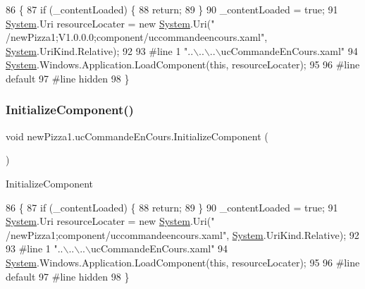 \begin{DoxyCode}
86                                           \{
87             \textcolor{keywordflow}{if} (\_contentLoaded) \{
88                 \textcolor{keywordflow}{return};
89             \}
90             \_contentLoaded = \textcolor{keyword}{true};
91             \hyperlink{namespaceSystem}{System}.Uri resourceLocater = \textcolor{keyword}{new} \hyperlink{namespaceSystem}{System}.Uri(\textcolor{stringliteral}{"
      /newPizza1;V1.0.0.0;component/uccommandeencours.xaml"}, \hyperlink{namespaceSystem}{System}.UriKind.Relative);
92             
93 \textcolor{preprocessor}{            #line 1 "..\(\backslash\)..\(\backslash\)..\(\backslash\)ucCommandeEnCours.xaml"}
94             \hyperlink{namespaceSystem}{System}.Windows.Application.LoadComponent(\textcolor{keyword}{this}, resourceLocater);
95             
96 \textcolor{preprocessor}{            #line default}
97 \textcolor{preprocessor}{            #line hidden}
98         \}
\end{DoxyCode}
\mbox{\label{classnewPizza1_1_1ucCommandeEnCours_a5838b3aa1f180eda285120814af5dadd}} 
\subsubsection{\texorpdfstring{Initialize\+Component()}{InitializeComponent()}\hspace{0.1cm}{\footnotesize\ttfamily [6/6]}}
{\footnotesize\ttfamily void new\+Pizza1.\+uc\+Commande\+En\+Cours.\+Initialize\+Component (\begin{DoxyParamCaption}{ }\end{DoxyParamCaption})\hspace{0.3cm}{\ttfamily [inline]}}



Initialize\+Component 


\begin{DoxyCode}
86                                           \{
87             \textcolor{keywordflow}{if} (\_contentLoaded) \{
88                 \textcolor{keywordflow}{return};
89             \}
90             \_contentLoaded = \textcolor{keyword}{true};
91             \hyperlink{namespaceSystem}{System}.Uri resourceLocater = \textcolor{keyword}{new} \hyperlink{namespaceSystem}{System}.Uri(\textcolor{stringliteral}{"
      /newPizza1;component/uccommandeencours.xaml"}, \hyperlink{namespaceSystem}{System}.UriKind.Relative);
92             
93 \textcolor{preprocessor}{            #line 1 "..\(\backslash\)..\(\backslash\)..\(\backslash\)ucCommandeEnCours.xaml"}
94             \hyperlink{namespaceSystem}{System}.Windows.Application.LoadComponent(\textcolor{keyword}{this}, resourceLocater);
95             
96 \textcolor{preprocessor}{            #line default}
97 \textcolor{preprocessor}{            #line hidden}
98         \}
\end{DoxyCode}


